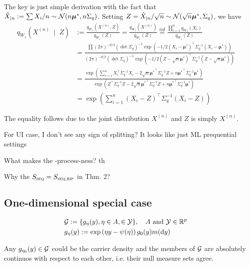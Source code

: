 The key is just simple derivation with the fact that $\hat{X}_{|n}:=\sum X_i/n \sim \mathcal{N}(n\bm{\mu}^*,n\Sigma_q)$.
Setting $Z=\hat{X}_{|n}/\sqrt{n} \sim \mathcal{N}(\sqrt{n}\bm{\mu}^*,\Sigma_q)$, we have
\begin{align*}
	q_{W_1}(X^{(n)} \;\mid\; Z) & := \frac{q_{W_1}(X^{(n)}, Z)}{q_{W_1}(Z)} = \frac{q_{W_1}(X^{(n)})}{q_{W_1}(Z)}
	\stackrel{iid}{=} \frac{\prod^n_{i=1}q_{W_1}(X_i)}{q_{W_1}(Z)}                                                                                  \\
	                            & = \frac{\prod(2\pi)^{-d/2}(\det \Sigma_q)^{-1} \exp(-1/2 (X_i-\bm{\mu}^*)^\top \Sigma_q^{-1} (X_i - \bm{\mu}^*))}
	{(2\pi)^{-d/2}(\det \Sigma_q)^{-1} \exp(-1/2(Z -\sqrt{n} \bm{\mu}^*)^\top \Sigma_q^{-1} (Z -\sqrt{n} \bm{\mu}^*))}                              \\
	                            & = \frac{\exp(\sum_{i=1}^n X_i^\top\Sigma_q^{-1}X_i - 2 \sqrt{n}{\bm{\mu}^*}^\top\Sigma_q^{-1}Z
		+ n {\bm{\mu}^*}^\top \Sigma_q^{-1}\bm{\mu}^*)}
	{\exp(Z^\top\Sigma_q^{-1}Z - 2 \sqrt{n}{\bm{\mu}^*}^\top\Sigma_q^{-1}Z
	+ n {\bm{\mu}^*}^\top \Sigma_q^{-1}\bm{\mu}^*)}                                                                                                 \\
	                            & = \exp(\sum_{i=1}^n (X_i - Z)^\top \Sigma_q^{-1} (X_i - Z))
\end{align*}

The equality follows due to the joint distribution $X^{(n)}$ and $Z$ is simply $X^{(n)}$.

For UI case, I don't see any sign of splitting? It looks like just ML prequential settings

What makes the \E-process-ness? th

Why the $S_{\textsc{seq}} = S_{\textsc{seq,rip}}$ in Thm. 2?

\subsection{One-dimensional special case}

\begin{align*}
	 & \Gc := \{g_{\eta}(y), \eta \in A,  \in \Yc \}, \quad A \text{ and } \Yc \in \Rf^p \\
	 & g_{\eta}(y) := \exp\left(\eta y - \psi(\eta)\right) g_0(y) m(\dd{y})
\end{align*}

\begin{remark}
	Any $g_{\eta_0}(y) \in \mathcal{G}$ could be the carrier density and the members of $\mathcal{G}$
	are absolutely continuos with respect to each other,
	i.e. their null measure sets agree.
\end{remark}

